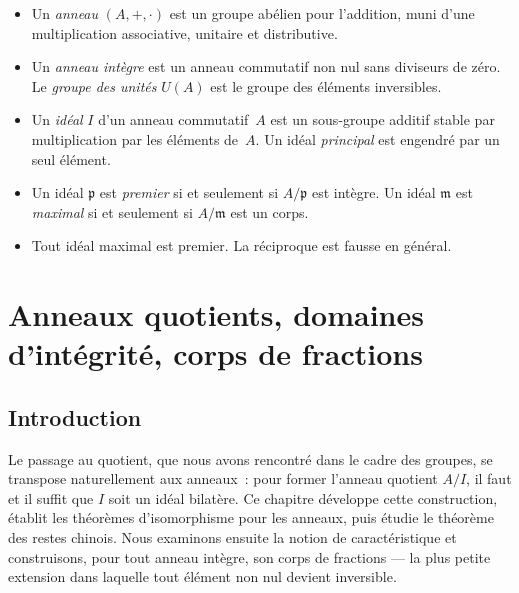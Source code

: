 \documentclass[12pt,a4paper,openany]{book}
\theoremstyle{definition}
\begin{document}
\begin{itemize}
  \item Un \emph{anneau} $(A,+,\cdot)$ est un groupe abélien pour
        l'addition, muni d'une multiplication associative, unitaire et
        distributive.
  \item Un \emph{anneau intègre} est un anneau commutatif non nul sans
        diviseurs de zéro. Le \emph{groupe des unités} $U(A)$ est le
        groupe des éléments inversibles.
  \item Un \emph{idéal} $I$ d'un anneau commutatif~$A$ est un
        sous-groupe additif stable par multiplication par les éléments
        de~$A$. Un idéal \emph{principal} est engendré par un seul
        élément.
  \item Un idéal $\mathfrak{p}$ est \emph{premier} si et seulement si
        $A/\mathfrak{p}$ est intègre. Un idéal $\mathfrak{m}$ est
        \emph{maximal} si et seulement si $A/\mathfrak{m}$ est un corps.
  \item Tout idéal maximal est premier. La réciproque est fausse en
        général.
\end{itemize}



\chapter{Anneaux quotients, domaines d'intégrité, corps de fractions}%
\label{chap:quotients-fractions}

\section*{Introduction}

Le passage au quotient, que nous avons rencontré dans le cadre des
groupes, se transpose naturellement aux anneaux~: pour former l'anneau
quotient $A/I$, il faut et il suffit que $I$ soit un idéal bilatère.
Ce chapitre développe cette construction, établit les théorèmes
d'isomorphisme pour les anneaux, puis étudie le théorème des restes
chinois. Nous examinons ensuite la notion de caractéristique et
construisons, pour tout anneau intègre, son corps de fractions --- la
plus petite extension dans laquelle tout élément non nul devient
inversible.
\end{document}

